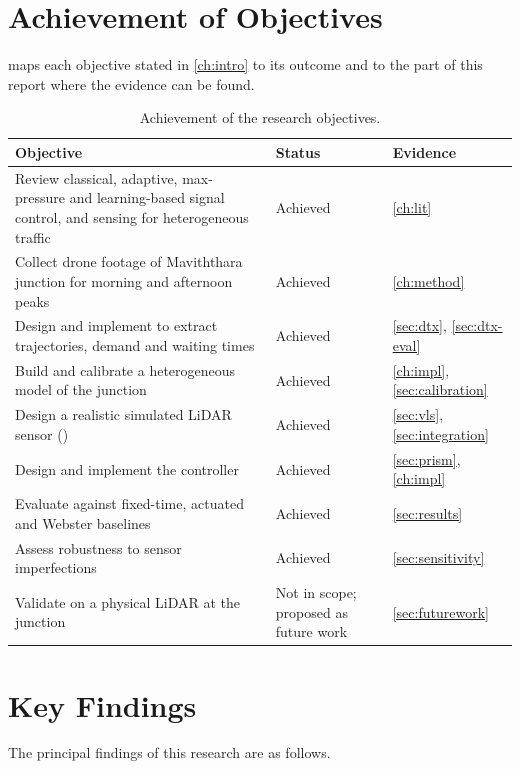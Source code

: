 \section{Achievement of Objectives}

 maps each objective stated in \cref{ch:intro} to its outcome and to the part of this report where the evidence can be found.

\begin{table}[H]
\centering
\caption{Achievement of the research objectives.}
\label{tab:objectives}
\small
\renewcommand{\arraystretch}{1.15}
\begin{tabularx}{\textwidth}{@{}>{\raggedright\arraybackslash}X l >{\raggedright\arraybackslash}p{3.6cm}@{}}
\toprule
Objective & Status & Evidence \\
\midrule
Review classical, adaptive, max-pressure and learning-based signal control, and sensing for heterogeneous traffic & Achieved & \cref{ch:lit} \\
Collect drone footage of Maviththara junction for morning and afternoon peaks & Achieved & \cref{ch:method} \\
Design and implement \dtx{} to extract trajectories, demand and waiting times & Achieved & \cref{sec:dtx}, \cref{sec:dtx-eval} \\
Build and calibrate a heterogeneous \sumo{} model of the junction & Achieved & \cref{ch:impl}, \cref{sec:calibration} \\
Design a realistic simulated LiDAR sensor (\vls{}) & Achieved & \cref{sec:vls}, \cref{sec:integration} \\
Design and implement the \prism{} controller & Achieved & \cref{sec:prism}, \cref{ch:impl} \\
Evaluate \prism{} against fixed-time, actuated and Webster baselines & Achieved & \cref{sec:results} \\
Assess robustness to sensor imperfections & Achieved & \cref{sec:sensitivity} \\
Validate on a physical LiDAR at the junction & Not in scope; proposed as future work & \cref{sec:futurework} \\
\bottomrule
\end{tabularx}
\end{table}

\section{Key Findings}

The principal findings of this research are as follows.

